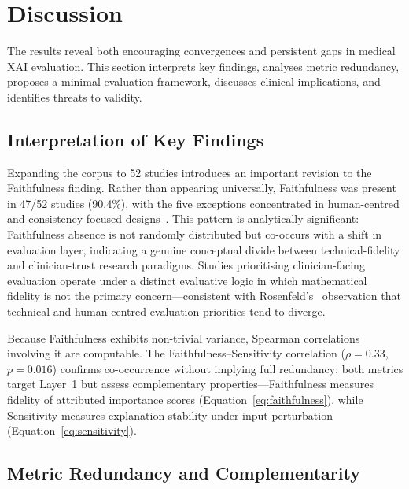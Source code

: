 \section{Discussion}

The results reveal both encouraging convergences and persistent gaps in medical XAI evaluation. This section interprets key findings, analyses metric redundancy, proposes a minimal evaluation framework, discusses clinical implications, and identifies threats to validity.

\subsection{Interpretation of Key Findings}

Expanding the corpus to 52 studies introduces an important revision to the Faithfulness finding. Rather than appearing universally, Faithfulness was present in 47/52 studies (90.4\%), with the five exceptions concentrated in human-centred and consistency-focused designs~\cite{rezaeian2026explainability,finzel2024human,bauer2025human,qin2025consistency,alpsalaz2026explainability}. This pattern is analytically significant: Faithfulness absence is not randomly distributed but co-occurs with a shift in evaluation layer, indicating a genuine conceptual divide between technical-fidelity and clinician-trust research paradigms. Studies prioritising clinician-facing evaluation operate under a distinct evaluative logic in which mathematical fidelity is not the primary concern---consistent with Rosenfeld's~\cite{rosenfeld2021better} observation that technical and human-centred evaluation priorities tend to diverge.

Because Faithfulness exhibits non-trivial variance, Spearman correlations involving it are computable. The Faithfulness--Sensitivity correlation ($\rho = 0.33$, $p = 0.016$) confirms co-occurrence without implying full redundancy: both metrics target Layer~1 but assess complementary properties---Faithfulness measures fidelity of attributed importance scores (Equation~\ref{eq:faithfulness}), while Sensitivity measures explanation stability under input perturbation (Equation~\ref{eq:sensitivity}).

\subsection{Metric Redundancy and Complementarity}

